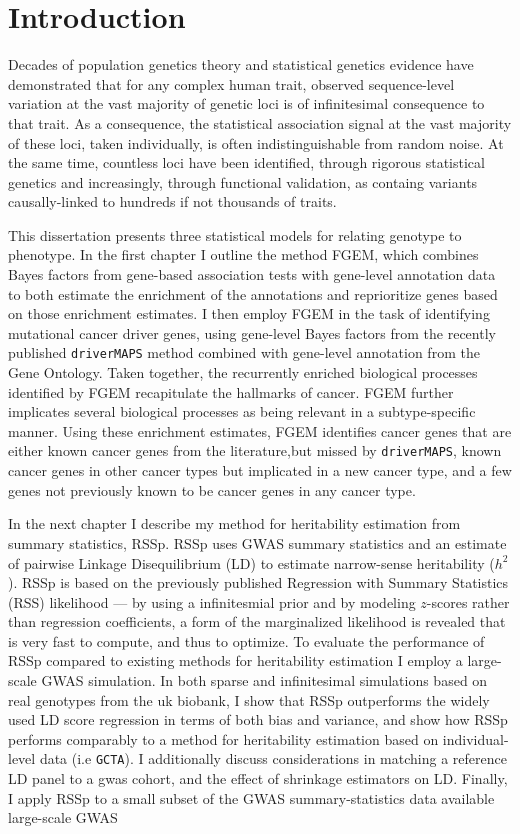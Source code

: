 \chapter{Introduction}
\label{introduction}

Decades of population genetics theory and statistical genetics evidence have demonstrated that for any complex human trait, observed sequence-level variation at the vast majority of genetic loci is of infinitesimal consequence to that trait.  As a consequence, the statistical association signal at the vast majority of these loci, taken individually, is often indistinguishable from random noise.
At the same time, countless loci have been identified, through rigorous statistical genetics and increasingly, through functional validation, as containg variants causally-linked to hundreds if not thousands of traits.

This dissertation presents three statistical models for relating genotype to phenotype.  In the first chapter I outline the method FGEM, which combines Bayes factors from gene-based association tests with gene-level annotation data to both estimate the enrichment of the annotations and reprioritize genes based on those enrichment estimates.  I then employ FGEM in the task of identifying mutational cancer driver genes, using gene-level Bayes factors from the recently published \texttt{driverMAPS} method\cite{drivermaps} combined with gene-level annotation from the Gene Ontology\cite{GO}.  Taken together, the recurrently enriched biological processes identified by FGEM recapitulate the hallmarks of cancer\cite{Hanahan_2011}.  FGEM  further implicates several biological processes as being relevant in a subtype-specific manner.  Using these enrichment estimates, FGEM identifies cancer genes that are either known cancer genes from the literature,but missed by \texttt{driverMAPS}, known cancer genes in other cancer types but implicated in a new cancer type, and a few genes not previously known to be cancer genes in any cancer type.

In the next chapter I describe my method for heritability estimation from summary statistics, RSSp.
RSSp uses GWAS summary statistics and an estimate of pairwise Linkage Disequilibrium (LD) to estimate narrow-sense heritability ($h^2$).  RSSp is based on the previously published Regression with Summary Statistics (RSS) likelihood\cite{Zhu_2017} --- by using a infinitesmial prior and by modeling $z$-scores rather than regression coefficients, a form of the marginalized likelihood is revealed that is very fast to compute, and thus to optimize.  To evaluate the performance of RSSp compared to existing methods for heritability estimation I employ a large-scale GWAS simulation.  In both sparse and infinitesimal simulations based on real genotypes from the uk biobank, I show that RSSp outperforms the widely used LD score regression\cite{ldsc} in terms of both bias and variance, and show how RSSp performs comparably to a method for heritability estimation based on individual-level data (i.e \texttt{GCTA}).  I additionally discuss considerations in matching a reference LD panel to a gwas cohort, and the effect of shrinkage estimators on LD. Finally, I apply RSSp to a small subset of the GWAS summary-statistics data available large-scale GWAS 

